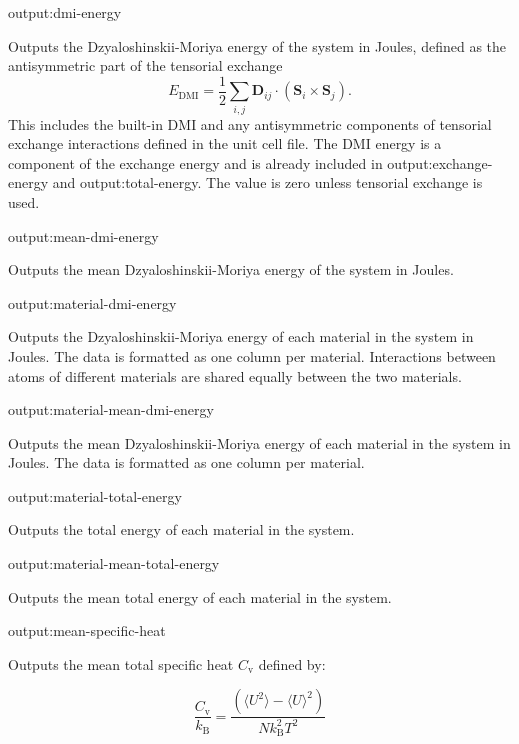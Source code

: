 {\zicf output:dmi-energy} Outputs the Dzyaloshinskii-Moriya energy of the system in Joules, defined as the antisymmetric part of the tensorial exchange
\begin{equation*}
E_{\mathrm{DMI}} = \frac{1}{2}\sum_{i,j} \mathbf{D}_{ij} \cdot \left(\mathbf{S}_i \times \mathbf{S}_j\right).
\end{equation*}
\noindent This includes the built-in DMI and any antisymmetric components of tensorial exchange interactions defined in the unit cell file. The DMI energy is a component of the exchange energy and is already included in {\zicf output:exchange-energy} and {\zicf output:total-energy}. The value is zero unless tensorial exchange is used.

{\zicf output:mean-dmi-energy} Outputs the mean Dzyaloshinskii-Moriya energy of the system in Joules.

{\zicf output:material-dmi-energy} Outputs the Dzyaloshinskii-Moriya energy of each material in the system in Joules. The data is formatted as one column per material. Interactions between atoms of different materials are shared equally between the two materials.

{\zicf output:material-mean-dmi-energy} Outputs the mean Dzyaloshinskii-Moriya energy of each material in the system in Joules. The data is formatted as one column per material.

{\zicf output:material-total-energy} Outputs the total energy of each material in the system.

{\zicf output:material-mean-total-energy} Outputs the mean total energy of each material in the system.

{\zicf output:mean-specific-heat} Outputs the mean total specific heat $C_{\mathrm{v}}$ defined by:

\begin{equation*}
\frac{C_{\mathrm{v}}}{k_{\mathrm{B}}} = \frac{\left(\langle U^2 \rangle - \langle U \rangle^2 \right)}{N k_{\mathrm{B}}^2 T^2}
\end{equation*}

